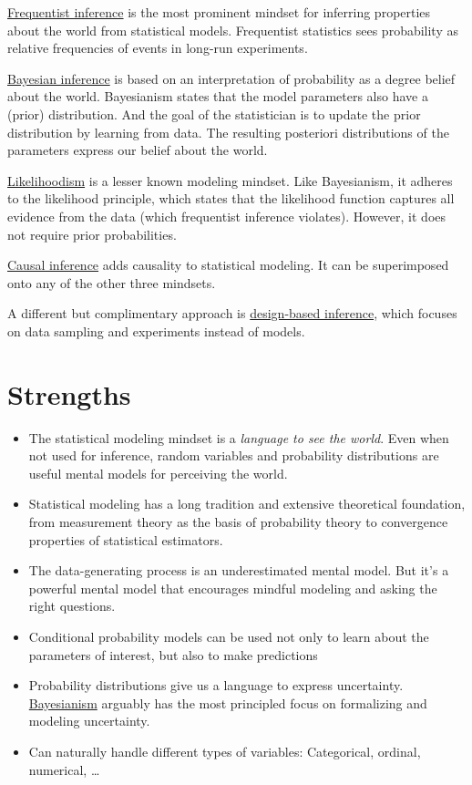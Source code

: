 \documentclass[
  10pt,
]{scrbook}
\providecommand{\tightlist}{%
  \setlength{\itemsep}{0pt}\setlength{\parskip}{0pt}}
\begin{document}
\protect\hyperlink{frequentism-frequentism}{Frequentist inference} is the most prominent mindset for inferring properties about the world from statistical models.
Frequentist statistics sees probability as relative frequencies of events in long-run experiments.

\protect\hyperlink{bayesian-inference}{Bayesian inference} is based on an interpretation of probability as a degree belief about the world.
Bayesianism states that the model parameters also have a (prior) distribution.
And the goal of the statistician is to update the prior distribution by learning from data.
The resulting posteriori distributions of the parameters express our belief about the world.

\protect\hyperlink{likelihoodism}{Likelihoodism} is a lesser known modeling mindset. Like Bayesianism, it adheres to the likelihood principle, which states that the likelihood function captures all evidence from the data (which frequentist inference violates).
However, it does not require prior probabilities.

\protect\hyperlink{causal-inference}{Causal inference} adds causality to statistical modeling. It can be superimposed onto any of the other three mindsets.

A different but complimentary approach is \protect\hyperlink{design-based-infernce}{design-based inference}, which focuses on data sampling and experiments instead of models.

\hypertarget{strengths}{%
\section{Strengths}\label{strengths}}

\begin{itemize}
\tightlist
\item
  The statistical modeling mindset is a \emph{language to see the world}. Even when not used for inference, random variables and probability distributions are useful mental models for perceiving the world.
\item
  Statistical modeling has a long tradition and extensive theoretical foundation, from measurement theory as the basis of probability theory to convergence properties of statistical estimators.
\item
  The data-generating process is an underestimated mental model. But it's a powerful mental model that encourages mindful modeling and asking the right questions.
\item
  Conditional probability models can be used not only to learn about the parameters of interest, but also to make predictions
\item
  Probability distributions give us a language to express uncertainty. \protect\hyperlink{bayesian-inference}{Bayesianism} arguably has the most principled focus on formalizing and modeling uncertainty.
\item
  Can naturally handle different types of variables: Categorical, ordinal, numerical, \ldots{}
\end{itemize}
\end{document}
